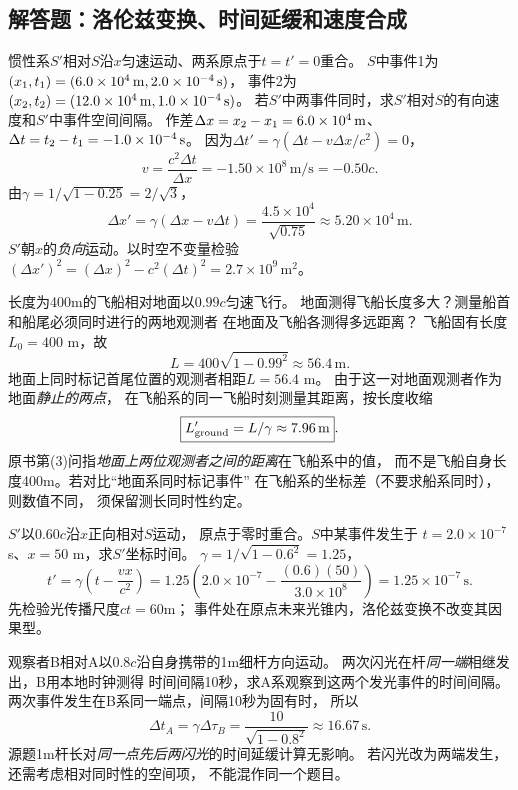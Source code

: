 \subsection{解答题：洛伦兹变换、时间延缓和速度合成}

\problemtext 惯性系$S'$相对$S$沿$x$匀速运动、两系原点于$t=t'=0$重合。
$S$中事件1为$(x_1,t_1)=(6.0\times10^4\rm\,m,2.0\times10^{-4}\rm\,s)$，
事件2为$(x_2,t_2)=(12.0\times10^4\rm\,m,1.0\times10^{-4}\rm\,s)$。
若$S'$中两事件同时，求$S'$相对$S$的有向速度和$S'$中事件空间间隔。
\workings
作差$\Delta x=x_2-x_1=6.0\times10^4\rm\,m$、
$\Delta t=t_2-t_1=-1.0\times10^{-4}\rm\,s$。
因为$\Delta t'=\gamma(\Delta t-v\Delta x/c^2)=0$，
\[
\boxed{v=\frac{c^2\Delta t}{\Delta x}=-1.50\times10^8\,\mathrm{m/s}=-0.50c}.
\]
由$\gamma=1/\sqrt{1-0.25}=2/\sqrt3$，
\[
\boxed{\Delta x'=\gamma(\Delta x-v\Delta t)
=\frac{4.5\times10^4}{\sqrt{0.75}}
\approx5.20\times10^4\,\mathrm m}.
\]
\crosscheck $S'$朝$x$的\emph{负向}运动。以时空不变量检验
$(\Delta x')^2=(\Delta x)^2-c^2(\Delta t)^2
=2.7\times10^9\,\mathrm{m^2}$。

\problemtext 长度为400m的飞船相对地面以$0.99c$匀速飞行。
地面测得飞船长度多大？测量船首和船尾必须同时进行的两地观测者
在地面及飞船各测得多远距离？
\workings
飞船固有长度$L_0=400$ m，故
\[
\boxed{L=400\sqrt{1-0.99^2}\approx56.4\,\mathrm m}.
\]
地面上同时标记首尾位置的观测者相距$L=56.4$ m。
由于这一对地面观测者作为地面\emph{静止的两点}，
在飞船系的同一飞船时刻测量其距离，按长度收缩
\[
\boxed{L'_{\rm ground}=L/\gamma\approx7.96\,\mathrm m}.
\]
\crosscheck 原书第(3)问指\emph{地面上两位观测者之间的距离}在飞船系中的值，
而不是飞船自身长度400m。若对比“地面系同时标记事件”
在飞船系的坐标差（不要求船系同时），则数值不同，
须保留测长同时性约定。

\problemtext $S'$以$0.60c$沿$x$正向相对$S$运动，
原点于零时重合。$S$中某事件发生于
$t=2.0\times10^{-7}$ s、$x=50$ m，求$S'$坐标时间。
\workings
$\gamma=1/\sqrt{1-0.6^2}=1.25$，
\[
\boxed{t'=\gamma\left(t-\frac{vx}{c^2}\right)
=1.25\left(2.0\times10^{-7}
-\frac{(0.6)(50)}{3.0\times10^8}\right)
=1.25\times10^{-7}\,\mathrm s}.
\]
\crosscheck 先检验光传播尺度$ct=60$m；
事件处在原点未来光锥内，洛伦兹变换不改变其因果型。

\problemtext 观察者B相对A以$0.8c$沿自身携带的1m细杆方向运动。
两次闪光在杆\emph{同一端}相继发出，B用本地时钟测得
时间间隔10秒，求A系观察到这两个发光事件的时间间隔。
\workings
两次事件发生在B系同一端点，间隔10秒为固有时，
所以
\[
\boxed{\Delta t_A=\gamma\Delta\tau_B
=\frac{10}{\sqrt{1-0.8^2}}\approx16.67\,\mathrm s}.
\]
\crosscheck 源题1m杆长对\emph{同一点先后两闪光}的时间延缓计算无影响。
若闪光改为两端发生，还需考虑相对同时性的空间项，
不能混作同一个题目。

